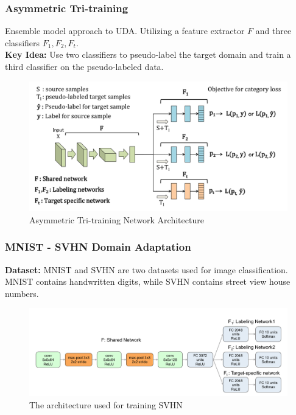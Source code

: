 \documentclass{beamer}
\begin{document}
\begin{frame}
    \frametitle{Asymmetric Tri-training}

    Ensemble model approach to UDA. Utilizing a feature extractor \(F\) and three classifiers \(F_1,F_2,F_t\).\\
    \textbf{Key Idea:} Use two classifiers to pseudo-label the target domain and train a third classifier on the pseudo-labeled data.\\


    \begin{figure}[h]
        \centering
        \includegraphics[width=0.9\linewidth]{ATT_achi.png}
        \caption{Asymmetric Tri-training Network Architecture}
    \end{figure}
\end{frame}

\begin{frame}
    \frametitle{MNIST - SVHN Domain Adaptation}
    \textbf{Dataset:} MNIST and SVHN are two datasets used for image classification. MNIST contains handwritten digits, while SVHN contains street view house numbers.\\

    \begin{figure}[h]
        \centering
        \includegraphics[width=0.9\linewidth]{att-msvhn-a.png}
        \caption{The architecture used for training SVHN}
    \end{figure}

\end{frame}
\end{document}
